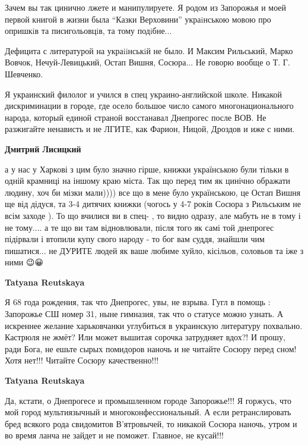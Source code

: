 \begin{itemize}
\begin{itemize}
Зачем вы так цинично лжете и манипулируете. Я родом из Запорожья и моей первой
книгой в жизни была \enquote{Казки Верховини} украiнською мовою про опришкiв та
писигольовцiв, та тому подiбне... 

Дефицита с литературой на украiiнськiй не было. И Максим Рильський, Марко
Вовчок, Нечуй-Левицький, Остап Вишня, Сосюра... Не говорю вообще о Т. Г.
Шевченко. 

Я украинский филолог и учился в спец украино-английской школе. Никакой
дискриминации в городе, где осело большое число самого многонационального
народа, который единой страной восстанавал Днепрогес после ВОВ. Не разжигайте
ненависть и не ЛГИТЕ, как Фарион, Ницой, Дроздов и иже с ними.



\textbf{Дмитрий Лисицкий} 

а у нас у Харкові з цим було значно гірше, книжки
українською були тільки в одній крамниці на іншому краю міста. Так що перед тим
як цинічно ображати людину, хоч би мізки мали)))) все що в мене було
українською, це Остап Вишня ще від дідуся, та 3-4 дитячих книжки (чогось у 4-7
років Сосюра з Рильським не всім заходе \Laughey[1.0][white]). То що вчилися ви в спец- , то
видно одразу, але мабуть не в тому і не тому.... а те що ви там відновлювали,
після того як самі той днепрогес підірвали і втопили купу свого народу - то бог
вам суддя, знайшли чим пишатися... не ДУРИТЕ людей як ваше любиме хуйло,
кісільов, соловьов та іже з ними 😉😀

\textbf{Tatyana Reutskaya} 

Я 68 года рождения, так что Днепрогес, увы, не
взрыва. Гугл в помощь : Запорожье СШ номер 31, ныне гимназия, так что о статусе
можно узнать. А искреннее желание харьковчанки углубиться в украинскую
литературу похвально. Кастрюля не жмёт? Или может вышитая сорочка затрудняет
вдох?! И прошу, ради Бога, не ешьте сырых помидоров наночь и не читайте Сосюру
перед сном! Хотя нет!!! Читайте Сосюру качественно!!!


\textbf{Tatyana Reutskaya} 

Да, кстати, о Днепрогесе и промышленном городе
Запорожье!!! Я горжусь, что мой город мультиязычный и многоконфессиональный. А
если ретранслировать бред всякого рода свидомитов В'ятровычей, то никакой
Сосюра наночь, утром и во время ланча не зайдет и не поможет. Главное, не
кусай!!!


\end{itemize}
\end{itemize}
